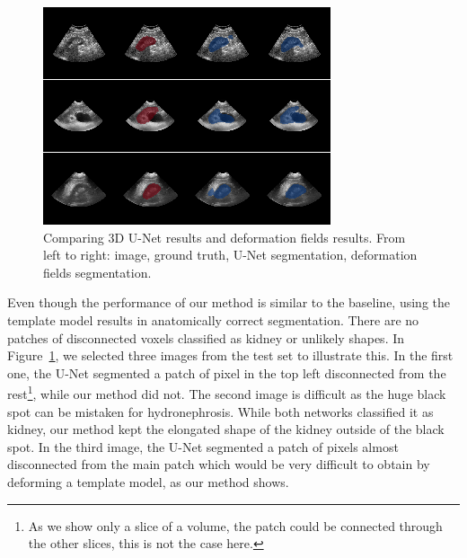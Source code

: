 

\begin{figure}[htbp]
    \centering
	\includegraphics[width=\textwidth]{img_seg/unet_vs_deform}
    \caption[Comparing 3D U-Net results and deformation fields results]{Comparing 3D U-Net results and deformation fields results. From left to right: image, ground truth, U-Net segmentation, deformation fields segmentation.}
    \label{fig:unet_vs_deform}
\end{figure}

Even though the performance of our method is similar to the baseline, using the template model results in anatomically correct segmentation. There are no patches of disconnected voxels classified as kidney or unlikely shapes. In Figure~\ref{fig:unet_vs_deform}, we selected three images from the test set to illustrate this. In the first one, the U-Net segmented a patch of pixel in the top left disconnected from the rest\footnote{As we show only a slice of a volume, the patch could be connected through the other slices, this is not the case here.}, while our method did not. The second image is difficult as the huge black spot can be mistaken for hydronephrosis. While both networks classified it as kidney, our method kept the elongated shape of the kidney outside of the black spot. In the third image, the U-Net segmented a patch of pixels almost disconnected from the main patch which would be very difficult to obtain by deforming a template model, as our method shows. 

